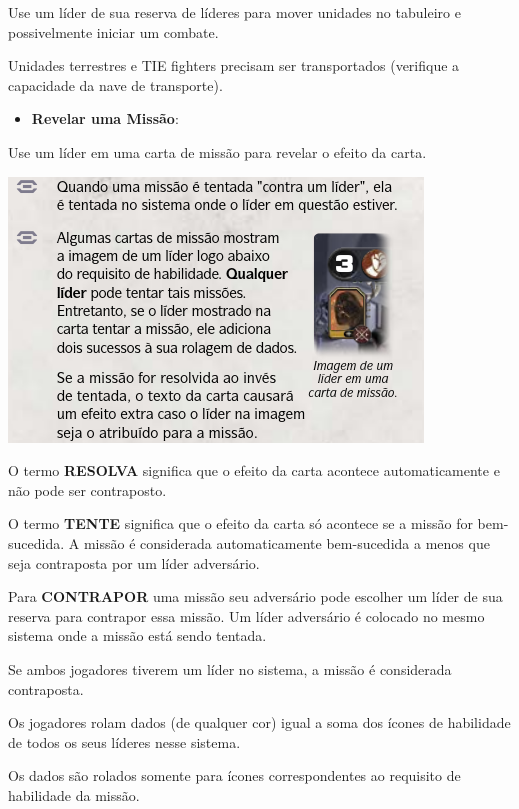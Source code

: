 \documentclass[11pt]{article}
\begin{document}
Use um líder de sua reserva de líderes para mover unidades no tabuleiro e possivelmente iniciar um combate.

Unidades terrestres e TIE fighters precisam ser transportados (verifique a capacidade da nave de transporte).

\begin{itemize}
\item \textbf{Revelar uma Missão}:
\end{itemize}

Use um líder em uma carta de missão para revelar o efeito da carta.

\begin{center}
\includegraphics[width=.9\linewidth]{./lider-effect.png}
\end{center}

O termo \textbf{RESOLVA} significa que o efeito da carta acontece automaticamente e não pode ser contraposto.

O termo \textbf{TENTE} significa que o efeito da carta só acontece se a missão for bem-sucedida. A missão é considerada automaticamente bem-sucedida a menos que seja contraposta por um líder adversário.

Para \textbf{CONTRAPOR} uma missão seu adversário pode escolher um líder de sua reserva para contrapor essa missão. Um líder adversário é colocado no mesmo sistema onde a missão está sendo tentada.

Se ambos jogadores tiverem um líder no sistema, a missão é considerada contraposta.

Os jogadores rolam dados (de qualquer cor) igual a soma dos ícones de habilidade de todos os seus líderes nesse sistema.

Os dados são rolados somente para ícones correspondentes ao requisito de habilidade da missão.
\end{document}
